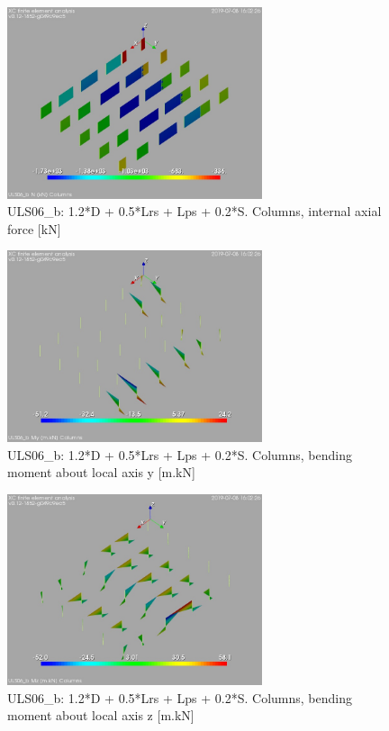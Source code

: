 \begin{figure}
\begin{center}
\includegraphics[width=75mm]{annex_res_columns/graphics/resSimplLC/ULS06_bcolumnsN}
\caption{ULS06\_b: 1.2*D + 0.5*Lrs + Lps + 0.2*S. Columns, internal axial force [kN]}
\end{center}
\end{figure}
\begin{figure}
\begin{center}
\includegraphics[width=75mm]{annex_res_columns/graphics/resSimplLC/ULS06_bcolumnsMy}
\caption{ULS06\_b: 1.2*D + 0.5*Lrs + Lps + 0.2*S. Columns, bending moment about local axis y [m.kN]}
\end{center}
\end{figure}
\begin{figure}
\begin{center}
\includegraphics[width=75mm]{annex_res_columns/graphics/resSimplLC/ULS06_bcolumnsMz}
\caption{ULS06\_b: 1.2*D + 0.5*Lrs + Lps + 0.2*S. Columns, bending moment about local axis z [m.kN]}
\end{center}
\end{figure}
